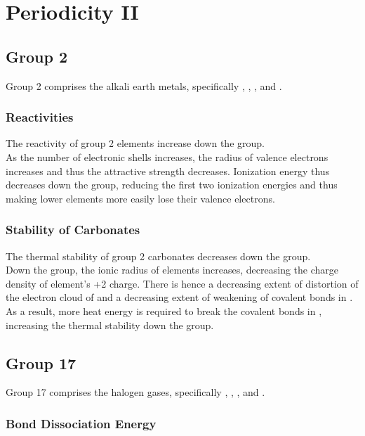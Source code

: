 \documentclass[../main]{subfiles}
\begin{document}
\section{Periodicity II}

	\subsection{Group 2}

	Group 2 comprises the alkali earth metals, specifically , , ,  and .

	\subsubsection{Reactivities}

	The reactivity of group 2 elements increase down the group. \\

	As the number of electronic shells increases, the radius of valence  electrons increases and thus the attractive strength decreases. Ionization energy thus decreases down the group, reducing the first two ionization energies and thus making lower elements more easily lose their valence electrons.

	\subsubsection{Stability of Carbonates}

	The thermal stability of group 2 carbonates decreases down the group. \\

	Down the group, the ionic radius of elements increases, decreasing the charge density of element's +2 charge. There is hence a decreasing extent of distortion of the electron cloud of  and a decreasing extent of weakening of covalent bonds in . As a result, more heat energy is required to break the covalent bonds in , increasing the thermal stability down the group.

	\subsection{Group 17}

	Group 17 comprises the halogen gases, specifically , , ,  and .

	\subsubsection{Bond Dissociation Energy}
\end{document}
